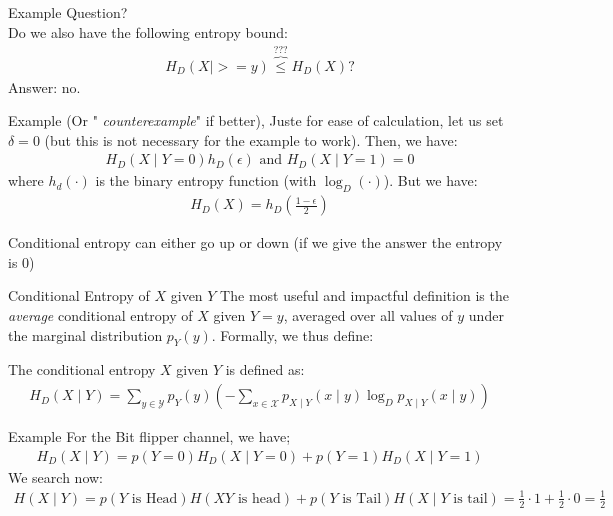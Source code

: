  \begin{parag}{Example}
     Question?
     \\
     Do we also have the following entropy bound:
     \begin{align*}
         H_D(X \mid > = y) \overbrace{ \leq}^{???} H_D(X)?
     \end{align*}
     Answer: no.

     \begin{subparag}{Example}
         (Or " \textit{counterexample}" if better), Juste for ease of calculation, let us set $ \delta = 0$ (but this is not necessary for the example to work). Then, we have:
         \begin{align*}
             H_D(X \mid Y = 0) h_D( \epsilon) \text{ and } H_D(X \mid Y= 1) = 0
         \end{align*}
         where $h_d( \cdot)$ is the binary entropy function (with $\log_D( \cdot)$). But we have:
         \begin{align*}
             H_D(X) = h_D( \frac{1 - \epsilon}{2})
         \end{align*}
     \end{subparag}
     \begin{framedremark}
         Conditional entropy can either go up or down (if we give the answer the entropy is $0$)
     \end{framedremark}
 \end{parag}
 \begin{parag}{Conditional Entropy of $X$ given $Y$}
     The most useful and impactful definition is the \textit{average} conditional entropy of $X$ given $Y = y$, averaged over all values of $y$ under the marginal distribution $p_Y(y)$. Formally, we thus define:
    \begin{definition}
    The conditional entropy $X$ given $Y$ is defined as:
    \begin{align*}
        H_D(X \mid Y) = \sum_{y \in \mathcal{Y}}p_Y(y) \left( - \sum_{x \in \mathcal{X}} p_{X \mid Y}(x \mid y)\log_D p_{X \mid Y} (x \mid y) \right)
    \end{align*}
\end{definition}

\begin{subparag}{Example}
    For the Bit flipper channel, we have;
    \begin{align*}
        H_D( X \mid  Y) = p(Y = 0) H_D(X \mid  Y = 0) + p(Y = 1)H_D( X \mid Y = 1)
    \end{align*}
    We search now:
    \begin{align*}
        H(X \mid  Y) = p(Y \text{ is Head}) H(X Y \text{ is head}) + p( Y \text{ is Tail}) H(X \mid  Y \text{ is tail}) = \frac{1}{2} \cdot 1 + \frac{1}{2} \cdot 0 = \frac{1}{2}
    \end{align*}
\end{subparag}
\end{parag}

